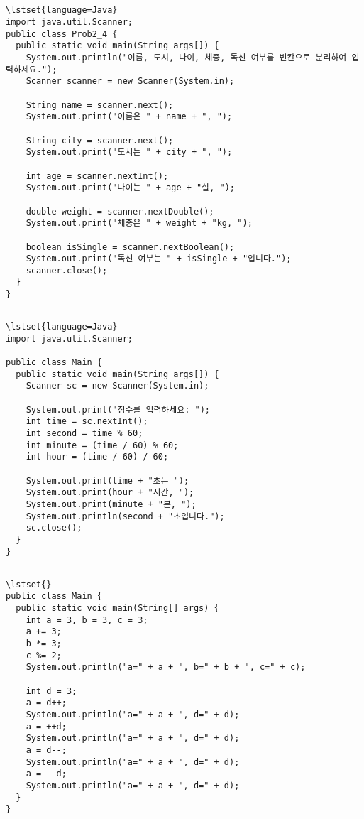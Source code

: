 \documentclass{article}
\begin{document}
\subsection{}
\begin{lstlisting}
\lstset{language=Java}
import java.util.Scanner;
public class Prob2_4 {
  public static void main(String args[]) {
    System.out.println("이름, 도시, 나이, 체중, 독신 여부를 빈칸으로 분리하여 입력하세요.");
    Scanner scanner = new Scanner(System.in);

    String name = scanner.next();
    System.out.print("이름은 " + name + ", ");
    
    String city = scanner.next();
    System.out.print("도시는 " + city + ", ");

    int age = scanner.nextInt();
    System.out.print("나이는 " + age + "살, ");

    double weight = scanner.nextDouble();
    System.out.print("체중은 " + weight + "kg, ");

    boolean isSingle = scanner.nextBoolean();
    System.out.print("독신 여부는 " + isSingle + "입니다.");
    scanner.close();
  }
}
\end{lstlisting}
\subsection{}
\begin{lstlisting}
\lstset{language=Java}
import java.util.Scanner;

public class Main {
  public static void main(String args[]) {
    Scanner sc = new Scanner(System.in);
    
    System.out.print("정수를 입력하세요: ");
    int time = sc.nextInt();
    int second = time % 60;
    int minute = (time / 60) % 60;
    int hour = (time / 60) / 60;

    System.out.print(time + "초는 ");
    System.out.print(hour + "시간, ");
    System.out.print(minute + "분, ");
    System.out.println(second + "초입니다.");
    sc.close();
  }
}
\end{lstlisting}
\subsection{}
\begin{lstlisting}
\lstset{}
public class Main {
  public static void main(String[] args) {
    int a = 3, b = 3, c = 3;
    a += 3;
    b *= 3;
    c %= 2;
    System.out.println("a=" + a + ", b=" + b + ", c=" + c);

    int d = 3;
    a = d++;
    System.out.println("a=" + a + ", d=" + d);
    a = ++d;
    System.out.println("a=" + a + ", d=" + d);
    a = d--;
    System.out.println("a=" + a + ", d=" + d);
    a = --d;
    System.out.println("a=" + a + ", d=" + d);
  }
}
\end{lstlisting}
\end{document}
